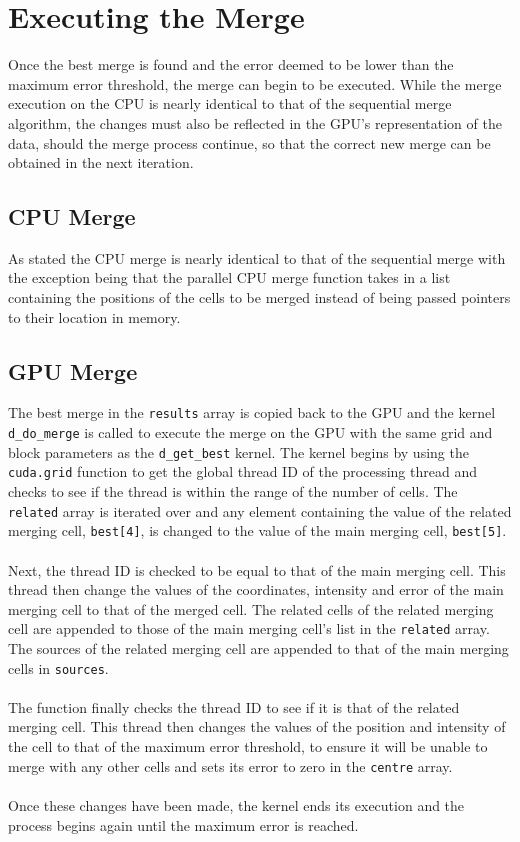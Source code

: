 \section{Executing the Merge}
Once the best merge is found and the error deemed to be lower than the maximum error threshold, the merge can begin to be executed. While the merge execution on the CPU is nearly identical to that of the sequential merge algorithm, the changes must also be reflected in the GPU's representation of the data, should the merge process continue, so that the correct new merge can be obtained in the next iteration.

\subsection{CPU Merge}
As stated the CPU merge is nearly identical to that of the sequential merge with the exception being that the parallel CPU merge function takes in a list containing the positions of the cells to be merged instead of being passed pointers to their location in memory.

\subsection{GPU Merge}
The best merge in the \texttt{results} array is copied back to the GPU and the kernel \texttt{d\_do\_merge} is called to execute the merge on the GPU with the same grid and block parameters as the \texttt{d\_get\_best} kernel. The kernel begins by using the \texttt{cuda.grid} function to get the global thread ID of the processing thread and checks to see if the thread is within the range of the number of cells. The \texttt{related} array is iterated over and any element containing the value of the related merging cell, \texttt{best[4]}, is changed to the value of the main merging cell, \texttt{best[5]}.
\\
\\
Next, the thread ID is checked to be equal to that of the main merging cell. This thread then change the values of the coordinates, intensity and error of the main merging cell to that of the merged cell. The related cells of the related merging cell are appended to those of the main merging cell's list in the \texttt{related} array. The sources of the related merging cell are appended to that of the main merging cells in \texttt{sources}.
\\
\\
The function finally checks the thread ID to see if it is that of the related merging cell. This thread then changes the values of the position and intensity of the cell to that of the maximum error threshold, to ensure it will be unable to merge with any other cells and sets its error to zero in the \texttt{centre} array.
\\
\\
Once these changes have been made, the kernel ends its execution and the process begins again until the maximum error is reached.